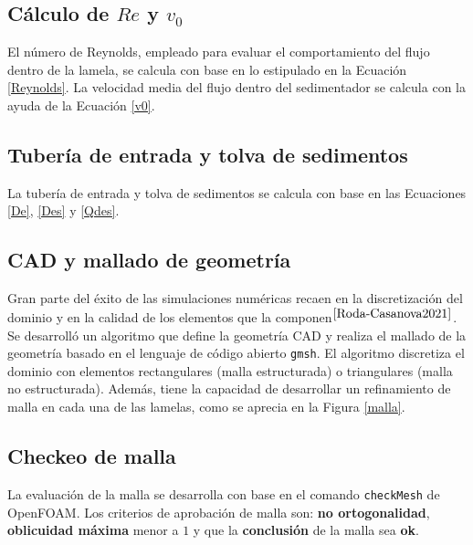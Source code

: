 \subsection{C\'alculo de $Re$ y $v_0$}

\noindent
\justify

El n\'umero de Reynolds, empleado para evaluar el comportamiento del flujo dentro de la lamela, se calcula con base en lo estipulado en la Ecuaci\'on \ref{Reynolds}. La velocidad media del flujo dentro del sedimentador se calcula con la ayuda de la Ecuaci\'on \ref{v0}.

\subsection{Tuber\'ia de entrada y tolva de sedimentos}

\noindent
\justify

La tuber\'ia de entrada y tolva de sedimentos se calcula con base en las Ecuaciones \ref{De}, \ref{Des} y \ref{Qdes}.

\subsection{CAD y mallado de geometr\'ia}

\noindent
\justify

Gran parte del \'exito de las simulaciones num\'ericas recaen en la discretizaci\'on del dominio y en la calidad de los elementos que la componen$^{\cite{Roda-Casanova2021}}$. Se desarroll\'o un algoritmo que define la geometr\'ia CAD y realiza el mallado de la geometr\'ia basado en el lenguaje de c\'odigo abierto \texttt{gmsh}. El algoritmo discretiza el dominio con elementos rectangulares (malla estructurada) o triangulares (malla no estructurada). Adem\'as, tiene la capacidad de desarrollar un refinamiento de malla en cada una de las lamelas, como se aprecia en la Figura \ref{malla}.

\subsection{Checkeo de malla}

\noindent
\justify

La evaluaci\'on de la malla se desarrolla con base en el comando \texttt{checkMesh} de OpenFOAM. Los criterios de aprobaci\'on de malla son: \textbf{no ortogonalidad}, \textbf{oblicuidad m\'axima} menor a $1$ y que la \textbf{conclusi\'on} de la malla sea \textbf{ok}.

